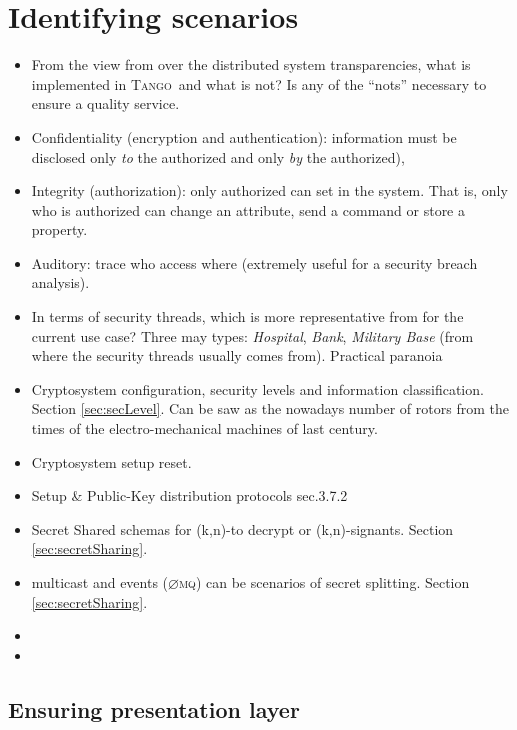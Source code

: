 \documentclass[10pt,a4paper,twoside]{llncs}
\newcommand{\tango}{\textsc{Tango}}
\newcommand{\zmq}{\textsc{$\varnothing$mq}}
\begin{document}
%
\section{Identifying scenarios \label{sec:scenarios}}

\begin{itemize}
 \item From the view from \cite{TanenbaumDistr} over the distributed system transparencies, what is implemented in \tango\, and what is not? Is any of the ``nots'' necessary to ensure a quality service.
 \item Confidentiality (encryption and authentication): information must be disclosed only \emph{to} the authorized and only \emph{by} the authorized),
 \item Integrity (authorization): only authorized can set in the system. That is, only who is authorized can change an attribute, send a command or store a property.
 \item Auditory: trace who access where (extremely useful for a security breach analysis).
 \item In terms of security threads, which is more representative from \cite{SecEngRossAnderson} for the current use case? Three may types: \emph{Hospital}, \emph{Bank}, \emph{Military Base} (from where the security threads usually comes from). Practical paranoia \cite{PractCryptoSchneier}
 \item Cryptosystem configuration, security levels and information classification. Section \ref{sec:secLevel}. Can be saw as the nowadays number of rotors from the times of the electro-mechanical machines of last century.
 \item Cryptosystem setup reset.
 \item Setup \& Public-Key distribution protocols \cite{SecEngRossAnderson} sec.3.7.2
 \item Secret Shared schemas for (k,n)-to decrypt or (k,n)-signants. Section \ref{sec:secretSharing}.
 \item multicast and events (\zmq) can be scenarios of secret splitting. Section \ref{sec:secretSharing}.
 \item 
 \item 
\end{itemize}

%
\subsection{Ensuring presentation layer \label{sec:presentationLayer}}
\end{document}
